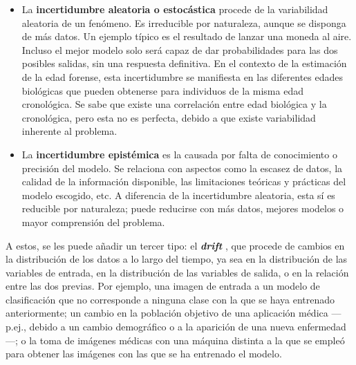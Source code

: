 \begin{itemize}
    
    \item La \textbf{incertidumbre aleatoria o estocástica} procede de la variabilidad aleatoria de un 
    fenómeno. 
    Es irreducible por naturaleza, aunque se disponga de más datos. 
    Un ejemplo típico es el resultado de lanzar una moneda al aire. Incluso el mejor modelo solo será capaz de 
    dar probabilidades para las dos posibles salidas, sin una respuesta definitiva. 
    En el contexto de la estimación de la edad forense, esta incertidumbre se manifiesta en las diferentes 
    edades biológicas que pueden obtenerse para individuos de la misma edad cronológica.
    Se sabe que existe una correlación entre edad biológica y la cronológica, pero esta no es perfecta, 
    debido a que existe variabilidad inherente al problema.

        
        
    


    \item La \textbf{incertidumbre epistémica} es la causada por falta de conocimiento o precisión del modelo.
    Se relaciona con aspectos como la escasez de datos, la calidad de la información disponible, las 
    limitaciones teóricas y prácticas del modelo escogido, etc. 
    A diferencia de la incertidumbre aleatoria, esta sí es reducible por naturaleza; puede reducirse con más
    datos, mejores modelos o mayor comprensión del problema. 
    
\end{itemize}

A estos, se les puede añadir un tercer tipo: el \textbf{\textit{drift}} \cite{gama2012, nemani2023}, que 
procede de cambios en la distribución de los datos a lo largo del tiempo, ya sea en la distribución de las 
variables de entrada, en la distribución de las variables de salida, o en la relación entre las dos previas. 
Por ejemplo, una imagen de entrada a un modelo de clasificación que no corresponde a ninguna clase con la que 
se haya entrenado anteriormente; un cambio en la población objetivo de una aplicación médica ---p.ej., debido 
a un cambio demográfico o a la aparición de una nueva enfermedad---; o la toma de imágenes médicas con una 
máquina distinta a la que se empleó para obtener las imágenes con las que se ha entrenado el modelo.

